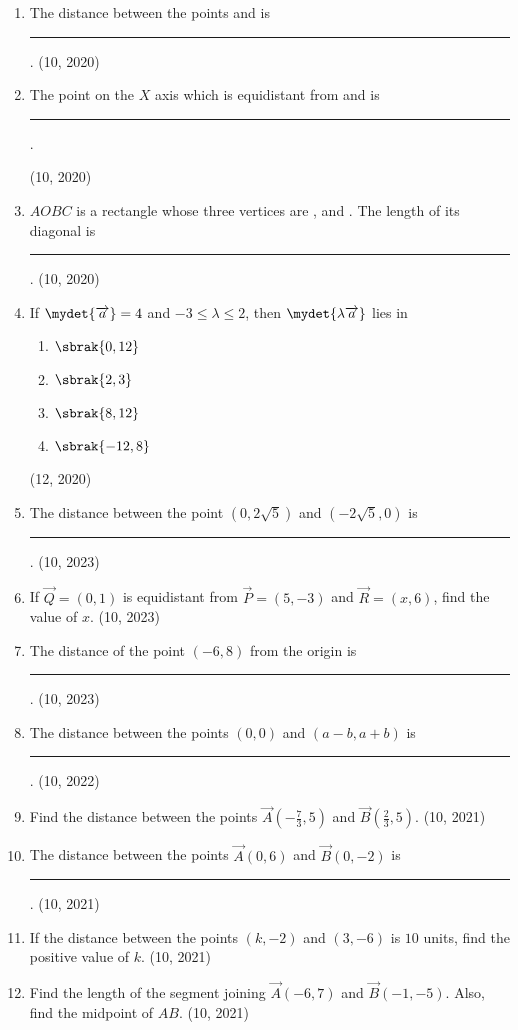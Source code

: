 \begin{enumerate}[label=\thesubsection.\arabic*, ref=\thesubsection.\theenumi]
	\item The distance between the points  and  is \rule{1cm}{0.2pt}.
\hfill (10, 2020)

\item The point on the $X$ axis which is equidistant from  and  is
\rule{1cm}{0.2pt}.

\hfill (10, 2020)
%
\item \(AOBC\) is a rectangle whose three vertices are ,  and . The length of its diagonal is
\rule{1cm}{0.2pt}.
\hfill (10, 2020)
\item If $\mydet{\overrightarrow{a}}= 4$ and $-3 \leq \lambda \leq 2$, then $\mydet{\lambda \overrightarrow a}$ lies in
\begin{enumerate}
\item $\sbrak{0,12}$
\item $\sbrak{2,3}$
\item $\sbrak{8,12}$
\item $\sbrak{-12,8}$
\end{enumerate}
\hfill (12, 2020)
    \item The distance between the point $(0,2\sqrt{5})$ and $(-2\sqrt{5},0)$ is
\rule{1cm}{0.2pt}.
    \hfill (10, 2023)
    \item If $\vec{Q} = (0,1)$ is equidistant from $\vec{P} = (5,-3)$ and $\vec{R} = (x,6)$, find the value of $x$.
    \hfill (10, 2023)
    \item The distance of the point $(-6,8)$ from the origin is
\rule{1cm}{0.2pt}.
    \hfill (10, 2023)
    \item The distance between the points $(0,0)$ and $(a-b, a+b)$ is 
\rule{1cm}{0.2pt}.
    \hfill (10, 2022)
	\item Find the distance between the points $\vec{A}\left(-\frac{7}{3}, 5\right)$ and $\vec{B}\left(\frac{2}{3}, 5\right)$. \hfill (10, 2021)
		\item The distance between the points $\vec{A}(0, 6)$ and $\vec{B}(0, -2)$ is
\rule{1cm}{0.2pt}.
		\hfill (10, 2021)
		\item If the distance between the points $(k, -2)$ and $(3, -6)$ is $10$ units, find the positive value of $k$. \hfill (10, 2021)
		\item Find the length of the segment joining $\vec{A}(-6, 7)$ and $\vec{B}(-1, -5)$. Also, find the midpoint of $AB$. \hfill (10, 2021)
	

\end{enumerate}
